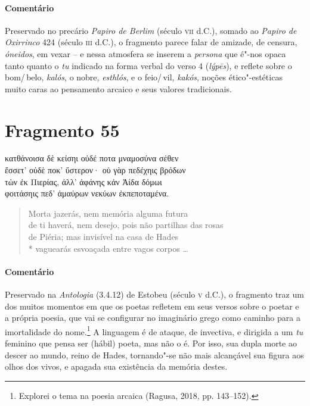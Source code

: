 \medskip

\paragraph{Comentário}
Preservado no precário \textit{Papiro de Berlim} (século \textsc{vii} d.C.), somado ao \textit{Papiro de Oxirrinco} 424 (século \textsc{iii} d.C.), o fragmento parece falar de amizade, de censura, \textit{óneidos}, em vexar -- e nessa atmosfera se inserem a \textit{persona} que é"-nos opaca tanto quanto o \textit{tu} indicado na  forma verbal do verso 4 (\textit{lýpēs}), e reflete sobre o bom/\,belo, \textit{kalós}, o nobre, \textit{esthlós}, e o feio/\,vil, \textit{kakós}, noções ético"-estéticas muito caras ao pensamento arcaico e seus valores tradicionais.


\pagebreak
\section{Fragmento 55}

\begin{gkverse}
κατθάνοισα δὲ κείσηι οὐδέ ποτα μναμοσύνα σέθεν\\
ἔσσετ’ οὐδὲ \dagger{}ποκ’\dagger{} ὔστερον· οὐ γὰρ πεδέχηις βρόδων\\
τὼν ἐκ Πιερίας, ἀλλ’ ἀφάνης κἀν Ἀίδα δόμωι\\
φοιτάσηις πεδ’ ἀμαύρων νεκύων ἐκπεποταμένα.
\end{gkverse}

\begin{verse}
Morta jazerás, nem memória alguma futura\\
de ti haverá, nem desejo, pois não partilhas das rosas\\
de Piéria; mas invisível na casa de Hades\\*
vaguearás esvoaçada entre vagos corpos \ldots{}
\end{verse}

\medskip

{\paragraph{Comentário} Preservado na \textit{Antologia} (3.4.12) de Estobeu (século \textsc{v} d.C.), o fragmento traz um dos muitos momentos em que os poetas refletem em seus versos
sobre o poetar e a própria poesia, que vai se configurar no imaginário grego
como caminho para a imortalidade do nome.\footnote{Explorei o tema na poesia arcaica (Ragusa, 2018, pp. 143--152).} A linguagem é de ataque, de
invectiva, e dirigida a um \textit{tu} feminino que pensa ser (hábil) poeta, mas
não o é. Por isso, sua dupla morte ao descer ao mundo, reino de
Hades, tornando"-se não mais alcançável sua figura aos olhos dos vivos, e
apagada sua existência da memória destes.}


